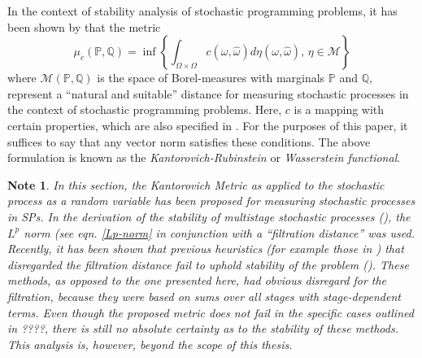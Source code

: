 \documentclass[a4paper, 12pt] {article}
\newtheorem*{Note}{Note}
\begin{document}
In the context of stability analysis of stochastic programming problems, it has been shown by \cite{Dupacova2003} that the metric 
\begin{equation}
  \label{eq:define-infinitedim-kantorovich}
  \mu_c(\mathbb{P}, \mathbb{Q}) = \inf\left\{\int_{\Omega\times\Omega}c(\omega, \hat{\omega})d\eta(\omega,\hat{\omega}),\, \eta\in\mathcal{M}\right\}
\end{equation}
where $\mathcal{M}(\mathbb{P, Q})$ is the space of Borel-measures with marginals $\mathbb{P}$ and $\mathbb{Q}$, represent a  ``natural and suitable'' distance for measuring stochastic processes in the context of stochastic programming problems. Here, $c$ is a mapping with certain properties, which are also specified in \cite{Dupacova2003}. For the purposes of this paper, it suffices to say that any vector norm satisfies these conditions. The above formulation is known as the \textit{Kantorovich-Rubinstein} or \textit{Wasserstein functional}.

\begin{Note}
  In this section, the Kantorovich Metric as applied to the stochastic process as a random variable has been proposed for measuring stochastic processes in SPs. In the derivation of the stability of multistage stochastic processes (\cite{Heitsch2010}), the $L^p$ norm (see eqn. \ref{Lp-norm} in conjunction with a ``filtration distance'' was used. Recently, it has been shown that previous heuristics (for example those in \cite{Dupacova2003}) that disregarded the filtration distance fail to uphold stability of the problem (\cite{Heitsch2009a}). These methods, as opposed to the one presented here, had obvious disregard for the filtration, because they were based on sums over all stages with stage-dependent terms. Even though the proposed metric does not fail in the specific cases outlined in \cite{Heitsch2009a}????, there is still no absolute certainty as to the stability of these methods. This analysis is, however, beyond the scope of this thesis. 
\end{Note}
\end{document}
